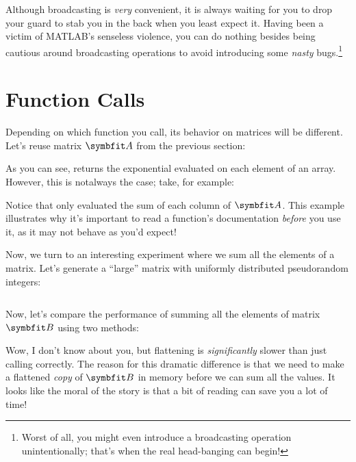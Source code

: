 \documentclass{article}
\begin{document}
Although broadcasting is \emph{very} convenient, it is always waiting
for you to drop your guard to stab you in the back when you least expect
it.  Having been a victim of MATLAB's senseless violence, you can do
nothing besides being cautious around broadcasting operations to avoid
introducing some \emph{nasty} bugs.\footnote{Worst of all, you might
even introduce a broadcasting operation unintentionally; that's when
the real head-banging can begin!}

\section{Function Calls}

Depending on which function you call, its behavior on matrices will be
different.  Let's reuse matrix \(\mat{A}\) from the previous section:


As you can see,  returns the exponential evaluated on each element of an
array. However, this is notalways the case; take, for example:


Notice that  only evaluated the sum of each column of \(\mat{A}\). This
example illustrates why it's important to read a function's
documentation \emph{before} you use it, as it may not behave as you'd
expect!

Now, we turn to an interesting experiment where we sum all the elements
of a matrix. Let's generate a \enquote{large} matrix with uniformly
distributed pseudorandom integers:

\inputminted{matlab}{02-vectorization.d/randi.m}

Now, let's compare the performance of summing all the elements of matrix
\(\mat{B}\) using two methods:



Wow, I don't know about you, but flattening is \emph{significantly}
slower than just calling  correctly.  The reason for this dramatic
difference is that we need to make a flattened \emph{copy} of
\(\mat{B}\) in memory before we can sum all the values.  It looks like
the moral of the story is that a bit of reading can save you a lot of
time!
\end{document}
